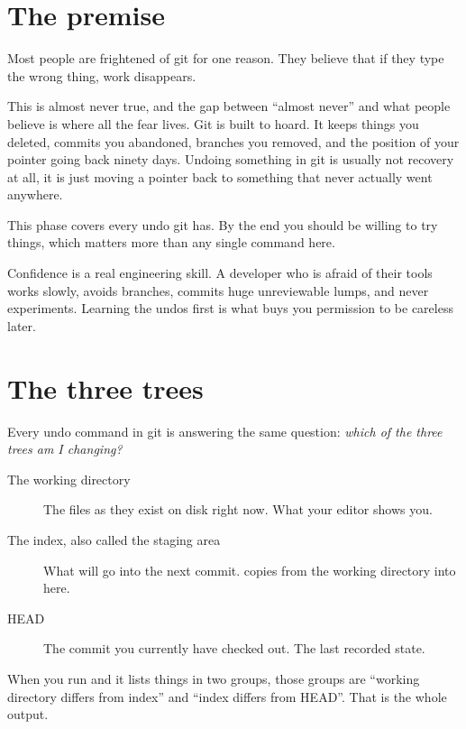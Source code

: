 \documentclass[11pt]{article}
\begin{document}
\maketitlepage

\section{The premise}

Most people are frightened of git for one reason. They believe that if they type
the wrong thing, work disappears.

This is almost never true, and the gap between ``almost never'' and what people
believe is where all the fear lives. Git is built to hoard. It keeps things you
deleted, commits you abandoned, branches you removed, and the position of your
 pointer going back ninety days. Undoing something in git is usually not
recovery at all, it is just moving a pointer back to something that never actually
went anywhere.

This phase covers every undo git has. By the end you should be willing to try
things, which matters more than any single command here.

\begin{why}
Confidence is a real engineering skill. A developer who is afraid of their tools
works slowly, avoids branches, commits huge unreviewable lumps, and never
experiments. Learning the undos first is what buys you permission to be careless
later.
\end{why}

\section{The three trees}

Every undo command in git is answering the same question: \emph{which of the three
trees am I changing?}

\begin{description}
  \item[The working directory] The files as they exist on disk right now. What
    your editor shows you.
  \item[The index, also called the staging area] What will go into the next commit.
     copies from the working directory into here.
  \item[HEAD] The commit you currently have checked out. The last recorded state.
\end{description}

When you run  and it lists things in two groups, those groups are
``working directory differs from index'' and ``index differs from HEAD''. That is
the whole output.
\end{document}
